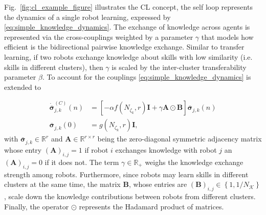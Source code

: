 Fig.~\ref{fig:cl_example_figure} illustrates the CL concept, the self loop represents the dynamics of a single robot learning, expressed by \eqref{eq:simple_knowledge_dynamics}. The exchange of knowledge across agents is represented via the cross-couplings weighted by a parameter $\gamma$ that models how efficient is the bidirectional pairwise knowledge exchange. Similar to transfer learning, if two robots exchange knowledge about skills with low similarity (i.e. skills in different clusters), then $\gamma$ is scaled by the inter-cluster transferability  parameter $\beta$. To account for the couplings \eqref{eq:simple_knowledge_dynamics} is extended to 


\begin{subequations}\label{eq:collective_knowledge_dynamics}
	\begin{alignat}{2}
		\dot{\bar{\bm{\sigma}}}^{(C)}_{j,k}\left(n\right) &= \left[-\alpha  f\left(N_{\zeta_k},r\right) \bm{I} + \gamma \bm{A} \odot \bm{B}  \right] \bar{\bm{\sigma}}_{j,k}\left(n\right)\\
		\bar{\bm{\sigma}}^{}_{j,k}(0) &= g\left( N_{\zeta_k}, r\right) \bm{I},
	\end{alignat}
\end{subequations}
with $\bar{\bm{\sigma}}^{}_{j,k} \in \mathbb{R}^r$ and $\bm{A} \in \mathbb{R}^{r \times r}$ being the zero-diagonal symmetric adjacency matrix whose entry $(\bm{A})_{i,j} = 1$ if robot $i$ exchanges knowledge with robot $j$ an $(\bm{A})_{i,j} = 0$ if it does not. The term $\gamma \in \mathbb{R}_+ $ weighs the knowledge exchange strength among robots. Furthermore, since robots may learn skills in different clusters at the same time, the matrix $\bm{B}$, whose entries are $\left(\bm{B}\right)_{i,j} \in \left \lbrace 1, 1/N_\mathcal{K} \right \rbrace$, scale down the knowledge contributions between robots from different clusters. Finally, the operator $\odot$ represents the Hadamard product of matrices.

